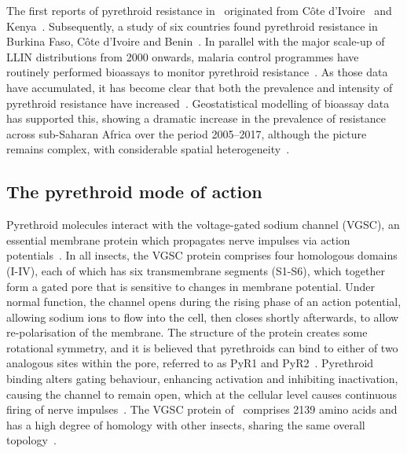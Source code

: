 \documentclass[a4paper,11pt,abstracton,hidelinks]{scrartcl}
\begin{document}
The first reports of pyrethroid resistance in \agam\ originated from  C\^ote d'Ivoire~\parencite{Elissa1993} and Kenya~\parencite{Vulule1994}.
%
Subsequently, a study of six countries found pyrethroid resistance in Burkina Faso, C\^ote d'Ivoire and Benin~\parencite{Chandre1999}.
%
In parallel with the major scale-up of LLIN distributions from 2000 onwards, malaria control programmes have routinely performed bioassays to monitor pyrethroid resistance~\parencite{WHO2018TPIRM,WHO2017FNPMMIR}.
%
As those data have accumulated, it has become clear that both the prevalence and intensity of pyrethroid resistance have increased~\parencite{Ranson2011,Hemingway2016,WHO2012GPIRM,WHO2018GRIR,IIRC2018}.
%
Geostatistical modelling of bioassay data has supported this, showing a dramatic increase in the prevalence of resistance across sub-Saharan Africa over the period 2005--2017, although the picture remains complex, with considerable spatial heterogeneity~\parencite{Hancock2020}.


\subsection{The pyrethroid mode of action}\label{subsec:intro-moa}


Pyrethroid molecules interact with the voltage-gated sodium channel (VGSC), an essential membrane protein which propagates nerve impulses via action potentials~\parencite{Dong2014}.
%
In all insects, the VGSC protein comprises four homologous domains (I-IV), each of which has six transmembrane segments (S1-S6), which together form a gated pore that is sensitive to changes in membrane potential.
%
Under normal function, the channel opens during the rising phase of an action potential, allowing sodium ions to flow into the cell, then closes shortly afterwards, to allow re-polarisation of the membrane.
%
The structure of the protein creates some rotational symmetry, and it is believed that pyrethroids can bind to either of two analogous sites within the pore, referred to as PyR1 and PyR2~\parencite{Du2013}.
%
Pyrethroid binding alters gating behaviour, enhancing activation and inhibiting inactivation, causing the channel to remain open, which at the cellular level causes continuous firing of nerve impulses~\parencite{Dong2014}.
%
The VGSC protein of \agam\ comprises 2139 amino acids and has a high degree of homology with other insects, sharing the same overall topology~\parencite{Davies2007}.
\end{document}
